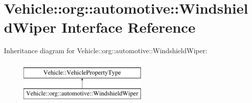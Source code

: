 \hypertarget{interfaceVehicle_1_1org_1_1automotive_1_1WindshieldWiper}{\section{Vehicle\-:\-:org\-:\-:automotive\-:\-:Windshield\-Wiper Interface Reference}
\label{interfaceVehicle_1_1org_1_1automotive_1_1WindshieldWiper}
}
Inheritance diagram for Vehicle\-:\-:org\-:\-:automotive\-:\-:Windshield\-Wiper\-:\begin{figure}[H]
\begin{center}
\leavevmode
\includegraphics[height=2.000000cm]{interfaceVehicle_1_1org_1_1automotive_1_1WindshieldWiper}
\end{center}
\end{figure}

